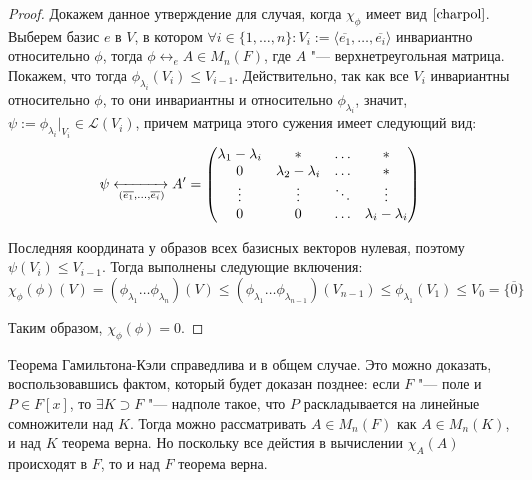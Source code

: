 \begin{proof}
	Докажем данное утверждение для случая, когда $\chi_\phi$ имеет вид $\eqref*{charpol}$. Выберем базис $e$ в $V$, в котором $\forall i \in \{1, \dots, n\}: V_i := \langle\overline{e_1}, \dots, \overline{e_i}\rangle$ инвариантно относительно $\phi$, тогда $\phi \leftrightarrow_e A \in M_n(F)$, где $A$ "--- верхнетреугольная матрица. Покажем, что тогда $\phi_{\lambda_i}(V_i) \le V_{i - 1}$. Действительно, так как все $V_i$ инвариантны относительно $\phi$, то они инвариантны и относительно $\phi_{\lambda_i}$, значит, $\psi := \phi_{\lambda_i}|_{V_i} \in \mathcal{L}(V_i)$, причем матрица этого сужения имеет следующий вид:
	\[\psi \xleftrightarrow[(\overline{e_1}, \dots, \overline{e_i})]{} A' = \begin{pmatrix}
		\lambda_1 - \lambda_i & * & \dots & *\\
		0 & \lambda_2 - \lambda _i & \dots & *\\
		\vdots & \vdots & \ddots & \vdots\\
		0 & 0 & \dots & \lambda_i - \lambda_i
	\end{pmatrix}\]
	
	Последняя координата у образов всех базисных векторов нулевая, поэтому $\psi(V_i) \le V_{i - 1}$. Тогда выполнены следующие включения:
	\[\chi_\phi(\phi)(V) = (\phi_{\lambda_1}\dots\phi_{\lambda_n})(V) \le (\phi_{\lambda_1}\dots\phi_{\lambda_{n - 1}})(V_{n - 1}) \le \phi_{\lambda_1}(V_1) \le V_0 = \{\overline{0}\}\]
	
	Таким образом, $\chi_\phi(\phi) = 0$.
\end{proof}

\begin{note}
	Теорема Гамильтона-Кэли справедлива и в общем случае. Это можно доказать, воспользовавшись фактом, который будет доказан позднее: если $F$ "--- поле и $P \in F[x]$, то $\exists K \supset F$ "--- надполе такое, что $P$ раскладывается на линейные сомножители над $K$. Тогда можно рассматривать $A \in M_n(F)$ как $A \in M_n(K)$, и над $K$ теорема верна. Но поскольку все дейстия в вычислении $\chi_A(A)$ происходят в $F$, то и над $F$ теорема верна.
\end{note}
